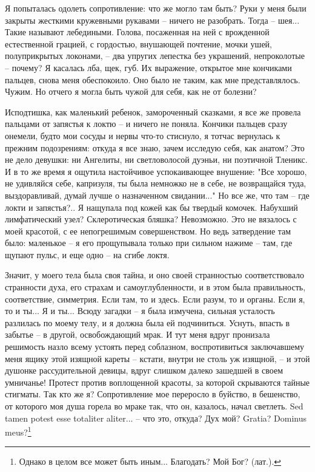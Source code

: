Я попыталась одолеть сопротивление: что же могло там быть? Руки у  меня
были  закрыты  жесткими кружевными рукавами -- ничего не разобрать. Тогда --
шея... Такие называют лебедиными. Голова, посаженная  на  ней  с  врожденной
естественной   грацией,   с   гордостью,  внушающей  почтение,  мочки  ушей,
полуприкрытых локонами, -- два упругих лепестка без украшений,  непроколотые
-- почему?  Я  касалась  лба, щек, губ. Их выражение, открытое мне кончиками
пальцев, снова меня обеспокоило. Оно было не таким, как мне  представлялось.
Чужим. Но отчего я могла быть чужой для себя, как не от болезни?

Исподтишка,  как  маленький  ребенок,  замороченный  сказками, я все же
провела пальцами от запястья к локтю -- и ничего не поняла. Кончики  пальцев
сразу  онемели, будто мои сосуды и нервы что-то стиснуло, я тотчас вернулась
к прежним подозрениям: откуда я все знаю, зачем исследую себя,  как  анатом?
Это  не  дело  девушки:  ни  Ангелиты, ни светловолосой дуэньи, ни поэтичной
Тленикс. И в то же время я ощутила настойчивое успокаивающее внушение:  "Все
хорошо,  не  удивляйся  себе,  капризуля,  ты  была  немножко  не в себе, не
возвращайся туда, выздоравливай, думай лучше о назначенном  свидании..."  Но
все  же,  что  там  --  где  локти и запястья?.. Я нащупала под кожей как бы
твердый  комочек.  Набухший  лимфатический  узел?   Склеротическая   бляшка?
Невозможно.   Это   не   вязалось   с   моей  красотой,  с  ее  непогрешимым
совершенством. Но ведь затвердение там было: маленькое -- я его  прощупывала
только  при  сильном нажиме -- там, где щупают пульс, и еще одно -- на сгибе
локтя.

Значит,   у  моего   тела  была   своя  тайна,   и  оно   своей  странностью
соответствовало странности духа,  его страхам и самоуглубленности,  и в этом
была  правильность, соответствие,  симметрия.  Если там,  то  и здесь.  Если
разум, то  и органы. Если я,  то и ты... Я  и ты... Всюду загадки  -- я была
измучена, сильная  усталость разлилась  по моему  телу, и  я должна  была ей
подчиниться. Уснуть,  впасть в  забытье -- в  другой, освобождающий  мрак. И
тут  меня вдруг  пронизала решимость  назло всему  устоять перед  соблазном,
воспротивиться заключавшему меня ящику этой изящной кареты -- кстати, внутри
не столь уж изящной, -- и  этой душонке рассудительной девицы, вдруг слишком
далеко зашедшей  в своем умничанье!  Протест против воплощенной  красоты, за
которой  скрываются  тайные  стигматы.  Так  кто  же  я?  Сопротивление  мое
переросло в буйство, в бешенство, от  которого моя душа горела во мраке так,
что он, казалось, начал светлеть.  Sed tamen potest esse totaliter aliter...
-- что это,  откуда? Дух мой? Gratia? Dominus  meus?\footnote{Однако в целом
все может быть иным... Благодать? Мой Бог? (лат.).}

